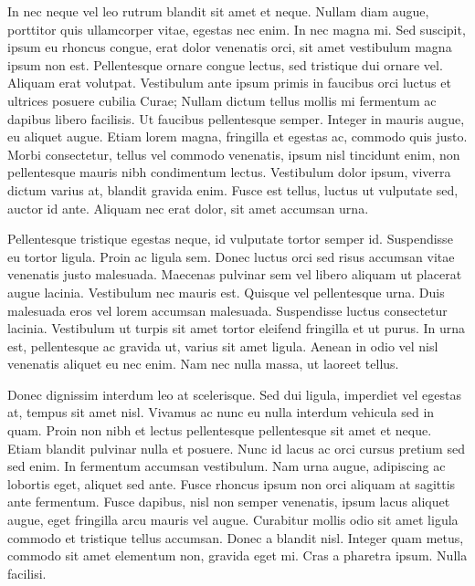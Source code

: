 In nec neque vel leo rutrum blandit sit amet et neque.
Nullam diam augue, porttitor quis ullamcorper vitae, egestas nec enim.
In nec magna mi.
Sed suscipit, ipsum eu rhoncus congue, erat dolor venenatis orci, sit amet vestibulum magna ipsum non est.
Pellentesque ornare congue lectus, sed tristique dui ornare vel.
Aliquam erat volutpat.
Vestibulum ante ipsum primis in faucibus orci luctus et ultrices posuere cubilia Curae; Nullam dictum tellus mollis mi fermentum ac dapibus libero facilisis.
Ut faucibus pellentesque semper.
Integer in mauris augue, eu aliquet augue.
Etiam lorem magna, fringilla et egestas ac, commodo quis justo.
Morbi consectetur, tellus vel commodo venenatis, ipsum nisl tincidunt enim, non pellentesque mauris nibh condimentum lectus.
Vestibulum dolor ipsum, viverra dictum varius at, blandit gravida enim.
Fusce est tellus, luctus ut vulputate sed, auctor id ante.
Aliquam nec erat dolor, sit amet accumsan urna.

Pellentesque tristique egestas neque, id vulputate tortor semper id.
Suspendisse eu tortor ligula.
Proin ac ligula sem.
Donec luctus orci sed risus accumsan vitae venenatis justo malesuada.
Maecenas pulvinar sem vel libero aliquam ut placerat augue lacinia.
Vestibulum nec mauris est.
Quisque vel pellentesque urna.
Duis malesuada eros vel lorem accumsan malesuada.
Suspendisse luctus consectetur lacinia.
Vestibulum ut turpis sit amet tortor eleifend fringilla et ut purus.
In urna est, pellentesque ac gravida ut, varius sit amet ligula.
Aenean in odio vel nisl venenatis aliquet eu nec enim.
Nam nec nulla massa, ut laoreet tellus.

Donec dignissim interdum leo at scelerisque.
Sed dui ligula, imperdiet vel egestas at, tempus sit amet nisl.
Vivamus ac nunc eu nulla interdum vehicula sed in quam.
Proin non nibh et lectus pellentesque pellentesque sit amet et neque.
Etiam blandit pulvinar nulla et posuere.
Nunc id lacus ac orci cursus pretium sed sed enim.
In fermentum accumsan vestibulum.
Nam urna augue, adipiscing ac lobortis eget, aliquet sed ante.
Fusce rhoncus ipsum non orci aliquam at sagittis ante fermentum.
Fusce dapibus, nisl non semper venenatis, ipsum lacus aliquet augue, eget fringilla arcu mauris vel augue.
Curabitur mollis odio sit amet ligula commodo et tristique tellus accumsan.
Donec a blandit nisl.
Integer quam metus, commodo sit amet elementum non, gravida eget mi.
Cras a pharetra ipsum.
Nulla facilisi.

